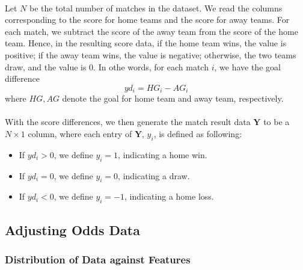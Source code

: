 \documentclass[12pt]{article}
\begin{document}
\paragraph{} 
Let $N$ be the total number of matches in the dataset. We read the columns corresponding to the score for home teams and the score for away teams. For each match, we subtract the score of the away team from the score of the home team. Hence, in the resulting score data, if the home team wins, the value is positive; if the away team wins, the value is negative; otherwise, the two teams draw, and the value is 0. In othe words, for each match $i$, we have the goal difference \[
yd_i = HG_i - AG_i
\] where $HG, AG$ denote the goal for home team and away team, respectively.
\paragraph{}
With the score differences, we then generate the match result data $\mathbf{Y}$ to be a $N \times 1$ column, where each entry of $\mathbf{Y}$, $y_i$, is defined as following:
\begin{itemize}
 \item If $yd_i > 0$, we define  $y_i = 1$, indicating a home win.
 \item If $yd_i = 0$, we define $y_i = 0$, indicating a draw.
 \item If $yd_i < 0$, we define $y_i = -1$, indicating a home loss.
\end{itemize}

\subsection{Adjusting Odds Data}
\subsubsection{Distribution of Data against Features}
\end{document}
